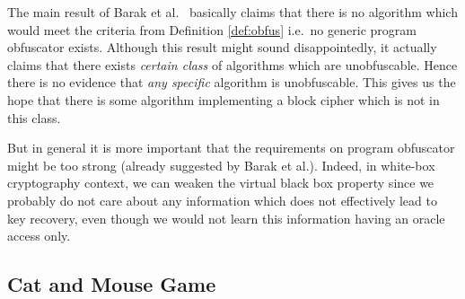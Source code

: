 	The main result of Barak et al.\ \cite{barak2001possibility} basically claims that there is no algorithm which would meet the criteria from Definition \ref{def:obfus} i.e.\ no generic program obfuscator exists. Although this result might sound disappointedly, it actually claims that there exists {\em certain class} of algorithms which are unobfuscable. Hence there is no evidence that {\em any specific} algorithm is unobfuscable. This gives us the hope that there is some algorithm implementing a block cipher which is not in this class.
	
	But in general it is more important that the requirements on program obfuscator might be too strong (already suggested by Barak et al.). Indeed, in white-box cryptography context, we can weaken the virtual black box property since we probably do not care about any information which does not effectively lead to key recovery, even though we would not learn this information having an oracle access only.



\subsection{Cat and Mouse Game}
\label{sec:catmouse}

